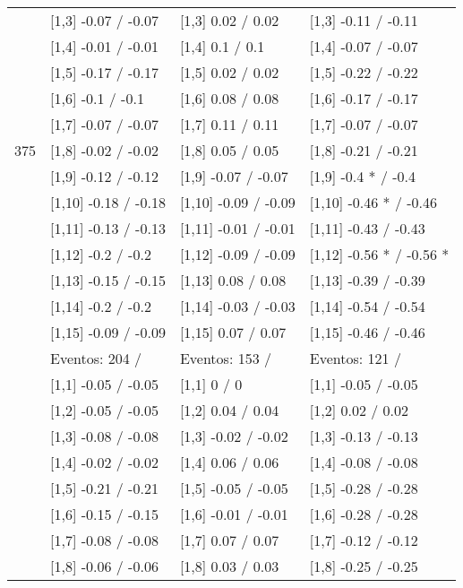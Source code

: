 \begin{table}
\begin{tabular}[t]{llll}
 & {}[1,3] -0.07  / -0.07 & {}[1,3] 0.02  / 0.02 & {}[1,3] -0.11  / -0.11\\
\addlinespace
 & {}[1,4] -0.01  / -0.01 & {}[1,4] 0.1  / 0.1 & {}[1,4] -0.07  / -0.07\\
 & {}[1,5] -0.17  / -0.17 & {}[1,5] 0.02  / 0.02 & {}[1,5] -0.22  / -0.22\\
 & {}[1,6] -0.1  / -0.1 & {}[1,6] 0.08  / 0.08 & {}[1,6] -0.17  / -0.17\\
 & {}[1,7] -0.07  / -0.07 & {}[1,7] 0.11  / 0.11 & {}[1,7] -0.07  / -0.07\\
375 & {}[1,8] -0.02  / -0.02 & {}[1,8] 0.05  / 0.05 & {}[1,8] -0.21  / -0.21\\
\addlinespace
 & {}[1,9] -0.12  / -0.12 & {}[1,9] -0.07  / -0.07 & {}[1,9] -0.4 * / -0.4\\
 & {}[1,10] -0.18  / -0.18 & {}[1,10] -0.09  / -0.09 & {}[1,10] -0.46 * / -0.46\\
 & {}[1,11] -0.13  / -0.13 & {}[1,11] -0.01  / -0.01 & {}[1,11] -0.43  / -0.43\\
 & {}[1,12] -0.2  / -0.2 & {}[1,12] -0.09  / -0.09 & {}[1,12] -0.56 * / -0.56 *\\
 & {}[1,13] -0.15  / -0.15 & {}[1,13] 0.08  / 0.08 & {}[1,13] -0.39  / -0.39\\
\addlinespace
 & {}[1,14] -0.2  / -0.2 & {}[1,14] -0.03  / -0.03 & {}[1,14] -0.54  / -0.54\\
 & {}[1,15] -0.09  / -0.09 & {}[1,15] 0.07  / 0.07 & {}[1,15] -0.46  / -0.46\\
 & Eventos:  204 / & Eventos:  153 / & Eventos:  121 /\\
 & {}[1,1] -0.05  / -0.05 & {}[1,1] 0  / 0 & {}[1,1] -0.05  / -0.05\\
 & {}[1,2] -0.05  / -0.05 & {}[1,2] 0.04  / 0.04 & {}[1,2] 0.02  / 0.02\\
\addlinespace
 & {}[1,3] -0.08  / -0.08 & {}[1,3] -0.02  / -0.02 & {}[1,3] -0.13  / -0.13\\
 & {}[1,4] -0.02  / -0.02 & {}[1,4] 0.06  / 0.06 & {}[1,4] -0.08  / -0.08\\
 & {}[1,5] -0.21  / -0.21 & {}[1,5] -0.05  / -0.05 & {}[1,5] -0.28  / -0.28\\
 & {}[1,6] -0.15  / -0.15 & {}[1,6] -0.01  / -0.01 & {}[1,6] -0.28  / -0.28\\
 & {}[1,7] -0.08  / -0.08 & {}[1,7] 0.07  / 0.07 & {}[1,7] -0.12  / -0.12\\
\addlinespace
500 & {}[1,8] -0.06  / -0.06 & {}[1,8] 0.03  / 0.03 & {}[1,8] -0.25  / -0.25\\

\end{tabular}
\end{table}
